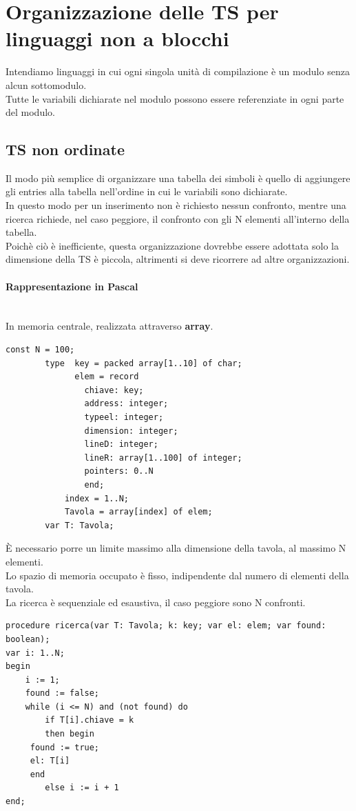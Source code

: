 \documentclass[12pt]{report}
\begin{document}
	\section{Organizzazione delle TS per linguaggi non a blocchi}
	Intendiamo linguaggi in cui ogni singola unità di compilazione è un modulo senza alcun sottomodulo. \\
	Tutte le variabili dichiarate nel modulo possono essere referenziate in ogni parte del modulo.
	\subsection{TS non ordinate}
	Il modo più semplice di organizzare una tabella dei simboli è quello di aggiungere gli entries alla tabella nell'ordine in cui le variabili sono dichiarate. \\
	In questo modo per un inserimento non è richiesto nessun confronto, mentre una ricerca richiede, nel caso peggiore, il confronto con gli N elementi all'interno della tabella. \\
	Poichè ciò è inefficiente, questa organizzazione dovrebbe essere adottata solo la dimensione della TS è piccola, altrimenti si deve ricorrere ad altre organizzazioni.
	\paragraph{Rappresentazione in Pascal} \quad \\
	In memoria centrale, realizzata attraverso \textbf{array}.
	\begin{lstlisting}[style=pascalstyle]
		const N = 100;
		type  key = packed array[1..10] of char;
			  elem = record
			  	chiave: key;
			  	address: integer;
			  	typeel: integer;
			  	dimension: integer;
			  	lineD: integer;
			  	lineR: array[1..100] of integer;
			  	pointers: 0..N
			  	end;
			index = 1..N;
			Tavola = array[index] of elem;
		var T: Tavola;
	\end{lstlisting}
	È necessario porre un limite massimo alla dimensione della tavola, al massimo N elementi. \\
	Lo spazio di memoria occupato è fisso, indipendente dal numero di elementi della tavola. \\
	La ricerca è sequenziale ed esaustiva, il caso peggiore sono N confronti.
	\begin{lstlisting}[style=pascalstyle]
procedure ricerca(var T: Tavola; k: key; var el: elem; var found: boolean);
var i: 1..N;
begin
	i := 1;
	found := false;
	while (i <= N) and (not found) do
		if T[i].chiave = k
		then begin
	 found := true;
	 el: T[i]
	 end
		else i := i + 1
end;
	\end{lstlisting}
\end{document}
